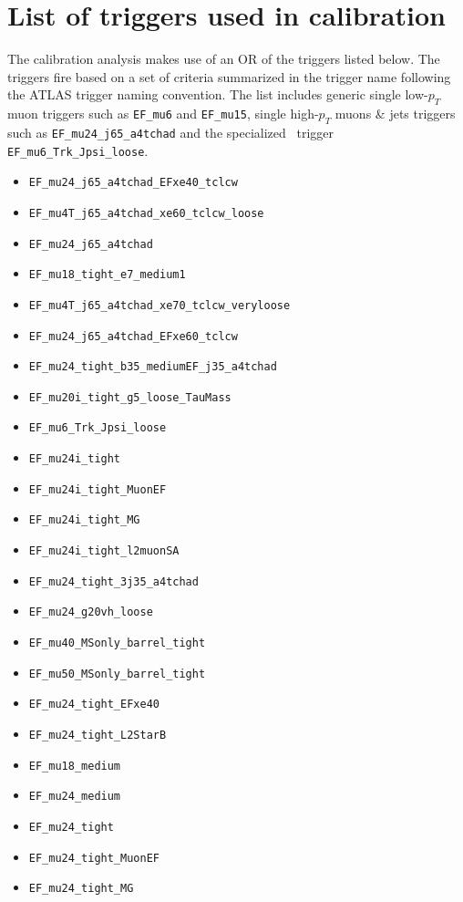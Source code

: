 \chapter{List of triggers used in calibration} \label{app:CalibrationTrigger}
The calibration analysis makes use of an OR of the triggers listed below. The triggers fire based on a set of criteria summarized in the trigger name following the ATLAS trigger naming convention.
The list includes generic single low-$p_{T}$ muon triggers such as \verb|EF_mu6| and \verb|EF_mu15|, single high-$p_{T}$ muons $\&$ jets triggers such as \verb|EF_mu24_j65_a4tchad| and the specialized \jpsi\ trigger \verb|EF_mu6_Trk_Jpsi_loose|.

\begin{itemize}
\item \verb|EF_mu24_j65_a4tchad_EFxe40_tclcw|
\item \verb|EF_mu4T_j65_a4tchad_xe60_tclcw_loose|
\item \verb|EF_mu24_j65_a4tchad|
\item \verb|EF_mu18_tight_e7_medium1|
\item \verb|EF_mu4T_j65_a4tchad_xe70_tclcw_veryloose|
\item \verb|EF_mu24_j65_a4tchad_EFxe60_tclcw|
\item \verb|EF_mu24_tight_b35_mediumEF_j35_a4tchad|
\item \verb|EF_mu20i_tight_g5_loose_TauMass|
\item \verb|EF_mu6_Trk_Jpsi_loose|
\item \verb|EF_mu24i_tight|
\item \verb|EF_mu24i_tight_MuonEF|
\item \verb|EF_mu24i_tight_MG|
\item \verb|EF_mu24i_tight_l2muonSA|
\item \verb|EF_mu24_tight_3j35_a4tchad|
\item \verb|EF_mu24_g20vh_loose|
\item \verb|EF_mu40_MSonly_barrel_tight|
\item \verb|EF_mu50_MSonly_barrel_tight|
\item \verb|EF_mu24_tight_EFxe40|
\item \verb|EF_mu24_tight_L2StarB|
\item \verb|EF_mu18_medium|
\item \verb|EF_mu24_medium|
\item \verb|EF_mu24_tight|
\item \verb|EF_mu24_tight_MuonEF|
\item \verb|EF_mu24_tight_MG|

\end{itemize}
